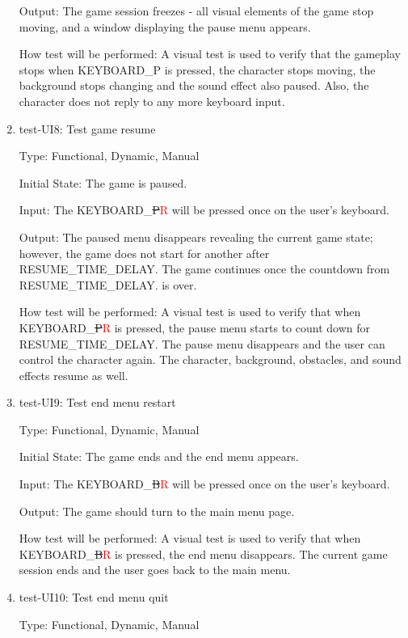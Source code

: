 \documentclass[12pt, titlepage]{article}
\begin{document}
\begin{enumerate}
Output: The game session freezes - all visual elements of the game stop moving, and a window displaying the pause menu appears.
					
How test will be performed: A visual test is used to verify that the gameplay stops when KEYBOARD\_P is pressed, the character stops moving, the background stops changing and the sound effect also paused. Also, the character does not reply to any more keyboard input.
				
\item{test-UI8: Test game resume\\}

Type: Functional, Dynamic, Manual
					
Initial State: The game is paused.
					
Input: The KEYBOARD\_\sout{P}\textcolor{red}{R} will be pressed once on the user's keyboard.
					
Output: The paused menu disappears revealing the current game state; however, the game does not start for another after RESUME\_TIME\_DELAY. The game continues once the countdown from RESUME\_TIME\_DELAY. is over.
					
How test will be performed: A visual test is used to verify that when KEYBOARD\_\sout{P}\textcolor{red}{R} is pressed, the pause menu starts to count down for RESUME\_TIME\_DELAY. The pause menu disappears and the user can control the character again. The character, background, obstacles, and sound effects resume as well.

\item{test-UI9: Test end menu restart\\}

Type: Functional, Dynamic, Manual
					
Initial State: The game ends and the end menu appears.
					
Input: The KEYBOARD\_\sout{B}\textcolor{red}{R} will be pressed once on the user's keyboard.
					
Output: The game should turn to the main menu page.
					
How test will be performed: A visual test is used to verify that when KEYBOARD\_\sout{B}\textcolor{red}{R} is pressed, the end menu disappears. The current game session ends and the user goes back to the main menu.	

\item{test-UI10: Test end menu quit\\}

Type: Functional, Dynamic, Manual
					

\end{enumerate}
\end{document}
